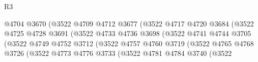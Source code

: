 \begin{lexlean}{R3}
\begin{coremodule}
                                            @4704
                                            @3670
                                            (@3522
                                              @4709
                                              @4712
                                              @3677
                                              (@3522
                                                @4717
                                                @4720
                                                @3684
                                                (@3522
                                                  @4725
                                                  @4728
                                                  @3691
                                                  (@3522
                                                    @4733
                                                    @4736
                                                    @3698
                                                    (@3522
                                                      @4741
                                                      @4744
                                                      @3705
                                                      (@3522
                                                        @4749
                                                        @4752
                                                        @3712
                                                        (@3522
                                                          @4757
                                                          @4760
                                                          @3719
                                                          (@3522
                                                            @4765
                                                            @4768
                                                            @3726
                                                            (@3522
                                                              @4773
                                                              @4776
                                                              @3733
                                                              (@3522
                                                                @4781
                                                                @4784
                                                                @3740
                                                                (@3522

\end{coremodule}
\end{lexlean}
